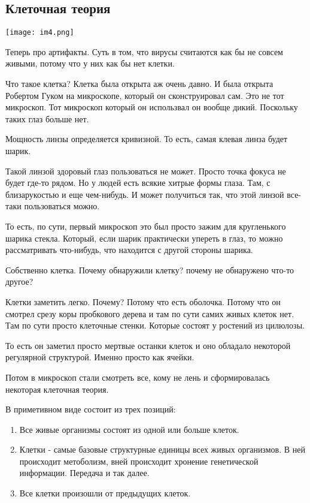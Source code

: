 \subsection{Клеточная теория}

\texttt{[image: im4.png]}

Теперь про артифакты. Суть в том, что вирусы считаются 
как бы не совсем живыми, потому что у них как бы нет 
клетки. 

Что такое клетка?
Клетка была открыта аж очень давно. И была открыта Робертом
Гуком на микроскопе, который он сконструировал сам. Это не тот
микроскоп. Тот микроскоп который он использвал он вообще дикий.
Поскольку таких глаз больше нет.

Мощность линзы определяется кривизной. То есть,
самая клевая линза будет шарик. 

Такой линзой здоровый глаз пользоваться не может.
Просто точка фокуса не будет где-то рядом. Но
у людей есть всякие хитрые формы глаза. Там, с
близарукостью и еще чем-нибудь. И может получиться
так, что этой линзой все-таки пользоваться можно.

То есть, по сути, первый микроскоп это был
просто зажим для кругленького шарика стекла.
Который, если шарик практически упереть в глаз,
то можно рассматривать что-нибудь, что находится
с другой стороны шарика.

Собственно клетка. Почему обнаружили клетку?
почему не обнаружено что-то другое?

Клетки заметить легко. Почему? Потому что есть
оболочка. Потому что он смотрел срезу
коры пробкового дерева и там по сути самих живых
клеток нет. Там по сути просто
клеточные стенки. Которые состоят у ростений из цилюлозы.

То есть он заметил просто мертвые останки клеток и
оно обладало некоторой регулярной структурой. Именно просто как
ячейки.

Потом в микроскоп стали смотреть все, кому не лень и
сформировалась некоторая клеточная теория.

В приметивном виде состоит из трех позиций:
\begin{enumerate}
\item 
Все живые организмы состоят из одной или больше клеток. 
\item 
Клетки - самые базовые структурные единицы всех живых организмов. 
В ней происходит метоболизм, вней происходит хронение генетической 
информации. Передача и так далее. 
\item 
Все клетки произошли от предыдущих клеток. 
\end{enumerate} 


